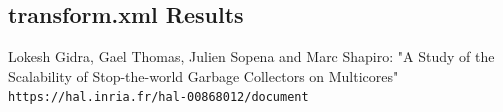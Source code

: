 \documentclass{article}
\begin{document}
  \subsection{transform.xml Results}

  \medskip
  \newpage

  \begin{thebibliography}{9}
      Lokesh Gidra, Gael Thomas, Julien Sopena and Marc Shapiro: "A Study of the Scalability of Stop-the-world Garbage Collectors on Multicores"
      \\\texttt{https://hal.inria.fr/hal-00868012/document}
  \end{thebibliography}
\end{document}

